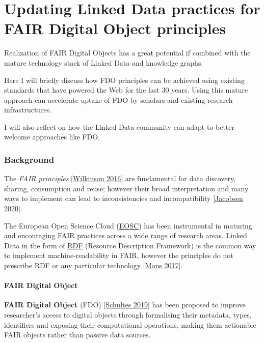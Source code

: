 \section{Updating Linked Data practices for FAIR Digital Object
principles}
\label{updating-linked-data-practices-for-fair-digital-object-principles}

Realization of FAIR Digital Objects has a great potential if combined with the mature technology stack of Linked Data and knowledge graphs.

Here I will briefly discuss how FDO principles can be achieved using existing standards that have powered the Web for the last 30 years. Using this mature approach can accelerate uptake of FDO by scholars and existing research infrastructures.

I will also reflect on how the Linked Data community can adapt to better welcome approaches like FDO.

\hypertarget{background}{%
\subsubsection{Background}\label{background}}

The \emph{FAIR principles}
{[}\href{https://doi.org/10.1038/sdata.2016.18}{Wilkinson 2016}{]} are
fundamental for data discovery, sharing, consumption and reuse; however
their broad interpretation and many ways to implement can lead to
inconsistencies and incompatibility
{[}\href{https://doi.org/10.1162/dint_r_00024}{Jacobsen 2020}{]}.

The European Open Science Cloud (\href{https://www.eosc.eu/}{EOSC}) has
been instrumental in maturing and encouraging FAIR practices across a
wide range of research areas. Linked Data in the form of
\href{https://www.w3.org/TR/rdf11-primer/}{RDF} (Resource Description
Framework) is the common way to implement machine-readability in FAIR,
however the principles do not prescribe RDF or any particular technology
{[}\href{https://doi.org/10.3233/ISU-170824}{Mons 2017}{]}.

\hypertarget{fair-digital-object}{%
\paragraph{FAIR Digital Object}\label{fair-digital-object}}

\textbf{FAIR Digital Object} (FDO)
{[}\href{https://doi.org/10.1007/978-3-030-23584-0_1}{Schultes 2019}{]}
has been proposed to improve researcher's access to digital objects
through formalising their metadata, types, identifiers and exposing
their computational operations, making them actionable FAIR objects
rather than passive data sources.

